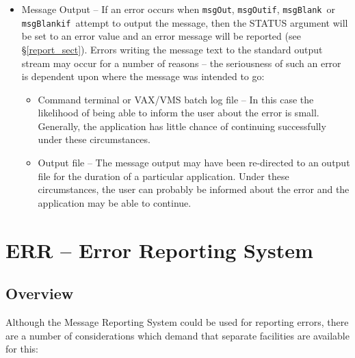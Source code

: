 \documentclass[twoside,11pt]{article}
\newcommand{\htmlref}[2]{#1}
\newcommand{\latex}[1]{#1}
\newcommand{\xlabel}[1]{}
\renewcommand{\_}{\texttt{\symbol{95}}}
\newcommand{\func}[1]{\texttt{#1}}
\newcommand{\msgblank}{\func{msgBlank}}
\newcommand{\msgblankif}{\func{msgBlankif}}
\newcommand{\msgout}{\func{msgOut}}
\newcommand{\msgoutif}{\func{msgOutif}}
\begin{document}
\begin {itemize}
\item Message Output -- If an error occurs when
\msgout, \msgoutif, \msgblank\ or \msgblankif\ attempt to output the message, then the
STATUS argument will be set to an error value and an  error message will be
\htmlref{reported}{report_sect}\latex{ (see \S\ref{report_sect})}.
Errors writing the message text to the standard output stream may occur for a
number of reasons -- the seriousness of such an error is dependent upon where
the message was intended to go:

\begin {itemize}
\item Command terminal or VAX/VMS batch log file --
In this case the likelihood of being able to inform the user about the error
is small.
Generally, the application has little chance of continuing successfully under
these circumstances.

\item Output file --
The message output may have been re-directed to an output file for the
duration of a particular application.
Under these circumstances, the user can probably be informed about the error
and the application may be able to continue.
\end {itemize}
\end {itemize}


\section{\xlabel{err_error_reporting_system}ERR -- Error Reporting System \xlabel{err}}

\subsection{\xlabel{overview}Overview}

Although the Message Reporting System could be used for reporting errors, there
are a number of considerations which demand that separate facilities are
available for this:
\end{document}
